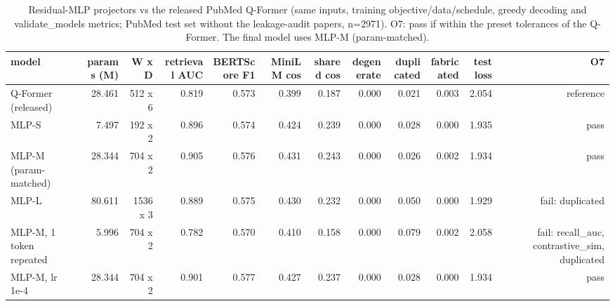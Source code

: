 \begin{table}[t]
\centering
\small
\caption{Residual-MLP projectors vs the released PubMed Q-Former (same inputs, training objective/data/schedule, greedy decoding and validate\_models metrics; PubMed test set without the leakage-audit papers, n=2971). O7: pass if within the preset tolerances of the Q-Former. The final model uses MLP-M (param-matched).}
\label{tab:a5_mlp_projector}
\begin{tabular}{lrrrrrrrrrrr}
\toprule
model & params (M) & W x D & retrieval AUC & BERTScore F1 & MiniLM cos & shared cos & degenerate & duplicated & fabricated & test loss & O7 \\
\midrule
Q-Former (released) & 28.461 & 512 x 6 & 0.819 & 0.573 & 0.399 & 0.187 & 0.000 & 0.021 & 0.003 & 2.054 & reference \\
MLP-S & 7.497 & 192 x 2 & 0.896 & 0.574 & 0.424 & 0.239 & 0.000 & 0.028 & 0.000 & 1.935 & pass \\
MLP-M (param-matched) & 28.344 & 704 x 2 & 0.905 & 0.576 & 0.431 & 0.243 & 0.000 & 0.026 & 0.002 & 1.934 & pass \\
MLP-L & 80.611 & 1536 x 3 & 0.889 & 0.575 & 0.430 & 0.232 & 0.000 & 0.050 & 0.000 & 1.929 & fail: duplicated \\
MLP-M, 1 token repeated & 5.996 & 704 x 2 & 0.782 & 0.570 & 0.410 & 0.158 & 0.000 & 0.079 & 0.002 & 2.058 & fail: recall\_auc, contrastive\_sim, duplicated \\
MLP-M, lr 1e-4 & 28.344 & 704 x 2 & 0.901 & 0.577 & 0.427 & 0.237 & 0.000 & 0.028 & 0.000 & 1.934 & pass \\
\bottomrule
\end{tabular}
\end{table}
